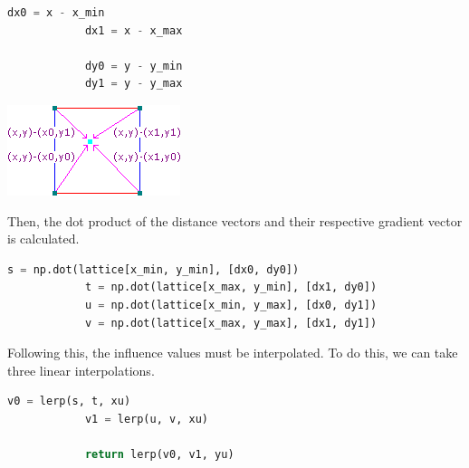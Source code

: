 \documentclass[10pt]{report}
\begin{document}
		\begin{lstlisting}[label={lst:2d-dst}, language=Python, frame=none, caption={Calculating the distance for two-dimensions.}, captionpos=b]
			dx0 = x - x_min
			dx1 = x - x_max
			
			dy0 = y - y_min
			dy1 = y - y_max
		\end{lstlisting}
	
		\begin{minipage}{\textwidth}
			\centering
			\includegraphics[scale=0.75]{2d_dist}
			\label{fig:2d_dist}
		\end{minipage} 
	
		Then, the dot product of the distance vectors and their respective gradient vector is calculated. 
		
		\begin{lstlisting}[label={lst:2d-infl}, language=Python, frame=none, caption={Calculating the influence values for two-dimensions.}, captionpos=b]
			s = np.dot(lattice[x_min, y_min], [dx0, dy0])
			t = np.dot(lattice[x_max, y_min], [dx1, dy0])
			u = np.dot(lattice[x_min, y_max], [dx0, dy1])
			v = np.dot(lattice[x_max, y_max], [dx1, dy1])
		\end{lstlisting}
	
		Following this, the influence values must be interpolated. To do this, we can take three linear interpolations. 
		
		\begin{lstlisting}[label={lst:2d-interp}, language=Python, frame=none, caption={Calculating the interpolated final value.}, captionpos=b]
			v0 = lerp(s, t, xu)
			v1 = lerp(u, v, xu)
			
			return lerp(v0, v1, yu)
		\end{lstlisting}
	
\end{document}
